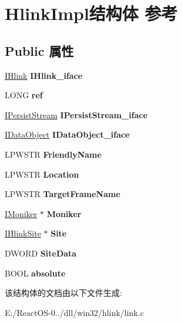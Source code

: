 \hypertarget{struct_hlink_impl}{}\section{Hlink\+Impl结构体 参考}
\label{struct_hlink_impl}
\subsection*{Public 属性}
\begin{DoxyCompactItemize}
\item 
\mbox{\label{struct_hlink_impl_a51e3290906b0e48b6e8309bdfe02e92e}} 
\hyperlink{interface_i_hlink}{I\+Hlink} {\bfseries I\+Hlink\+\_\+iface}
\item 
\mbox{\label{struct_hlink_impl_a71b32c2468c515bf698ea6bba17389a8}} 
L\+O\+NG {\bfseries ref}
\item 
\mbox{\label{struct_hlink_impl_a7072546300716fd2bf75cc930c7fcac2}} 
\hyperlink{interface_i_persist_stream}{I\+Persist\+Stream} {\bfseries I\+Persist\+Stream\+\_\+iface}
\item 
\mbox{\label{struct_hlink_impl_a0d7a68e9661e2dc4b2f878d9251c41ea}} 
\hyperlink{interface_i_data_object}{I\+Data\+Object} {\bfseries I\+Data\+Object\+\_\+iface}
\item 
\mbox{\label{struct_hlink_impl_af81d41365e5b0ba1c4e84124ca7c3b21}} 
L\+P\+W\+S\+TR {\bfseries Friendly\+Name}
\item 
\mbox{\label{struct_hlink_impl_ae4423b6bddf1fdb3bbe4ffca21223283}} 
L\+P\+W\+S\+TR {\bfseries Location}
\item 
\mbox{\label{struct_hlink_impl_abe91f2011a2c6e2542bcbefb2c4c5254}} 
L\+P\+W\+S\+TR {\bfseries Target\+Frame\+Name}
\item 
\mbox{\label{struct_hlink_impl_a047837855b3d9376ecb29a6102312d3e}} 
\hyperlink{interface_i_moniker}{I\+Moniker} $\ast$ {\bfseries Moniker}
\item 
\mbox{\label{struct_hlink_impl_a5741bcd7e7342d7936f237a3c7285a37}} 
\hyperlink{interface_i_hlink_site}{I\+Hlink\+Site} $\ast$ {\bfseries Site}
\item 
\mbox{\label{struct_hlink_impl_a40ff5d22e25338a3addbe921e5c467be}} 
D\+W\+O\+RD {\bfseries Site\+Data}
\item 
\mbox{\label{struct_hlink_impl_a156b6361cab59f872b8742e6cfe58114}} 
B\+O\+OL {\bfseries absolute}
\end{DoxyCompactItemize}


该结构体的文档由以下文件生成\+:\begin{DoxyCompactItemize}
\item 
E\+:/\+React\+O\+S-\/0../dll/win32/hlink/link.\+c\end{DoxyCompactItemize}
